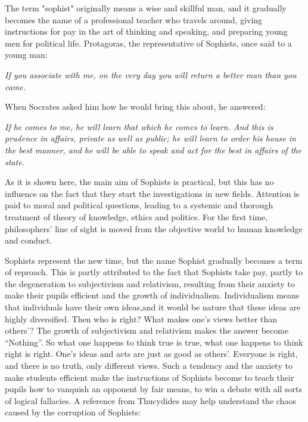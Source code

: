 \documentclass[11pt]{article}
\begin{document}
\newline

The term "sophist" originally means a wise and skillful man, and it gradually becomes the name of a professional teacher who travels around, giving instructions for pay in the art of thinking and speaking, and preparing young men for political life. 
Protagoras, the representative of Sophists, once said to a young man:
  
\textit{If you associate with me, on the very day you will return a better man than you came.}

When Socrates asked him how he would bring this about, he answered:

\textit{If he comes to me, he will learn that which he comes to learn. And this is prudence in affairs, private as well as public; he will learn to order his house in the best manner, and he will be able to speak and act for the best in affairs of the state.}

As it is shown here, the main aim of Sophists is practical, but this has no influence on the fact that they start the investigations in new fields. 
Attention is paid to moral and political questions, leading to a systemic and thorough treatment of theory of knowledge, ethics and politics. 
For the first time, philosophers’ line of sight is moved from the objective world to human knowledge and conduct. 

\newline

Sophists represent the new time, but the name Sophist gradually becomes a term of reproach. 
This is partly attributed to the fact that Sophists take pay, partly to the degeneration to subjectivism and relativism, resulting from their anxiety to make their pupils efficient and the growth of individualism. 
Individualism means that individuals have their own ideas,and it would be nature that these ideas are highly diversified. 
Then who is right? 
What makes one’s views better than others’? 
The growth of subjectivism and relativism makes the answer become “Nothing”. 
So what one happens to think true is true, what one happens to think right is right. 
One’s ideas and acts are just as good as others’. 
Everyone is right, and there is no truth, only different views. 
Such a tendency and the anxiety to make students efficient make the instructions of Sophists become to teach their pupils how to vanquish an opponent by fair means, to win a debate with all sorts of logical fallacies. 
A reference from Thucydides may help understand the chaos caused by the corruption of Sophists:
  
\end{document}
